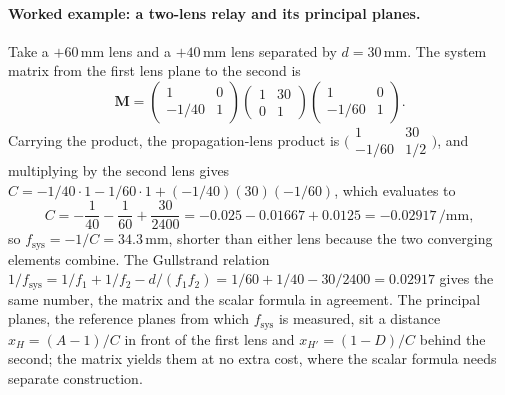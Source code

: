 \paragraph{Worked example: a two-lens relay and its principal planes.} Take a
$+60\,\si{\milli\meter}$ lens and a $+40\,\si{\milli\meter}$ lens separated by
$d = 30\,\si{\milli\meter}$. The system matrix from the first lens plane to the
second is
\[
\mathbf{M} = \begin{pmatrix} 1 & 0 \\ -1/40 & 1\end{pmatrix}
\begin{pmatrix} 1 & 30 \\ 0 & 1\end{pmatrix}
\begin{pmatrix} 1 & 0 \\ -1/60 & 1\end{pmatrix}.
\]
Carrying the product, the propagation-lens product is
$\big(\begin{smallmatrix} 1 & 30 \\ -1/60 & 1/2\end{smallmatrix}\big)$, and
multiplying by the second lens gives
$C = -1/40\cdot 1 - 1/60 \cdot 1 + (-1/40)(30)(-1/60)$, which evaluates to
\[
C = -\frac{1}{40} - \frac{1}{60} + \frac{30}{2400}
= -0.025 - 0.01667 + 0.0125 = -0.02917\,\si{\per\milli\meter},
\]
so $f_{\text{sys}} = -1/C = 34.3\,\si{\milli\meter}$, shorter than either lens
because the two converging elements combine. The Gullstrand relation
$1/f_{\text{sys}} = 1/f_1 + 1/f_2 - d/(f_1 f_2) = 1/60 + 1/40 - 30/2400 =
0.02917$ gives the same number, the matrix and the scalar formula in agreement.
The principal planes, the reference planes from which $f_{\text{sys}}$ is
measured, sit a distance $x_H = (A-1)/C$ in front of the first lens and
$x_{H'} = (1-D)/C$ behind the second; the matrix yields them at no extra cost,
where the scalar formula needs separate construction.

